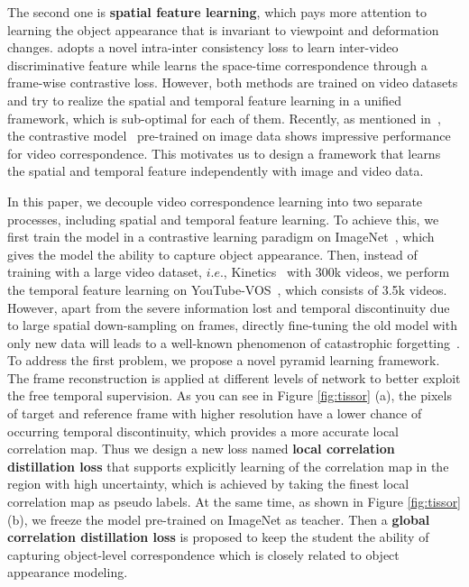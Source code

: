 \documentclass{article}
\begin{document}
The second one is \textbf{spatial feature learning}, which pays more attention to learning the object appearance that is invariant to viewpoint and deformation changes. \cite{wang2020contrastive} adopts a novel intra-inter consistency loss to learn inter-video discriminative feature while \cite{xu2021rethinking} learns the space-time correspondence through a frame-wise contrastive loss. However, both methods are trained on video datasets and try to realize the spatial and temporal feature learning in a unified framework, which is sub-optimal for each of them. Recently, as mentioned in~\cite{wang2021different}, the contrastive model~\cite{he2020momentum}\cite{xie2021detco} pre-trained on image data shows impressive performance for video correspondence. This motivates us to design a framework that learns the spatial and temporal feature independently with image and video data.  

In this paper, we decouple video correspondence learning into two separate processes, including spatial and temporal feature learning. To achieve this, we first train the model in a contrastive learning paradigm on ImageNet~\cite{deng2009large}, which gives the model the ability to capture object appearance. Then, instead of training with a large video dataset, $i.e.$, Kinetics~\cite{carreira2017quo} with 300k videos, we perform the temporal feature learning on YouTube-VOS~\cite{xu2018youtube}, which consists of 3.5k videos. However, apart from the severe  information lost and temporal discontinuity due to large spatial down-sampling on frames, directly fine-tuning the old model with only new data will leads to a well-known phenomenon of catastrophic forgetting~\cite{li2017learning}. To address the first problem, we propose a novel pyramid learning framework. The frame reconstruction is applied at different levels of network to better exploit the free temporal supervision. As you can see in Figure \ref{fig:tissor} (a), the pixels of target and reference frame with higher resolution have a lower chance of occurring temporal discontinuity, which provides a more accurate local correlation map. Thus we design a new loss named \textbf{local correlation distillation loss} that supports explicitly learning of the correlation map in the region with high uncertainty, which is achieved by taking the finest local correlation map as pseudo labels. At the same time, as shown in Figure \ref{fig:tissor} (b), we freeze the model pre-trained on ImageNet as teacher. Then a \textbf{global correlation distillation loss} is proposed to keep the student the ability of capturing object-level correspondence which is closely related to object appearance modeling. 
\end{document}
